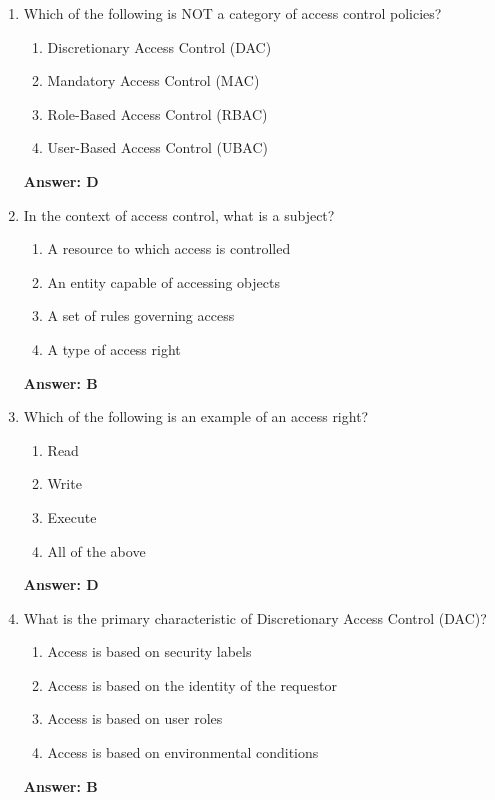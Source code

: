 \documentclass{article}
\begin{document}
\begin{enumerate}
    \item Which of the following is NOT a category of access control policies?
    \begin{enumerate}[label=\Alph*)]
        \item Discretionary Access Control (DAC)
        \item Mandatory Access Control (MAC)
        \item Role-Based Access Control (RBAC)
        \item User-Based Access Control (UBAC)
    \end{enumerate}
    \textbf{Answer: D}

    \item In the context of access control, what is a subject?
    \begin{enumerate}[label=\Alph*)]
        \item A resource to which access is controlled
        \item An entity capable of accessing objects
        \item A set of rules governing access
        \item A type of access right
    \end{enumerate}
    \textbf{Answer: B}

    \item Which of the following is an example of an access right?
    \begin{enumerate}[label=\Alph*)]
        \item Read
        \item Write
        \item Execute
        \item All of the above
    \end{enumerate}
    \textbf{Answer: D}

    \item What is the primary characteristic of Discretionary Access Control (DAC)?
    \begin{enumerate}[label=\Alph*)]
        \item Access is based on security labels
        \item Access is based on the identity of the requestor
        \item Access is based on user roles
        \item Access is based on environmental conditions
    \end{enumerate}
    \textbf{Answer: B}


\end{enumerate}
\end{document}
